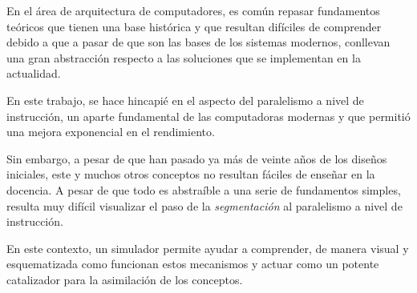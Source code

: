 En el área de arquitectura de computadores, es común repasar fundamentos teóricos
que tienen una base histórica y que resultan difíciles de comprender debido 
a que a pasar de que son las bases de los sistemas modernos, conllevan 
una gran abstracción respecto a las soluciones que se implementan en la actualidad.

\bigskip
En este trabajo, se hace hincapié en el aspecto del paralelismo a nivel de instrucción, 
un aparte fundamental de las computadoras modernas y que permitió una mejora exponencial
en el rendimiento.

\bigskip
Sin embargo, a pesar de que han pasado ya más de veinte años de los diseños iniciales,
este y muchos otros conceptos no resultan fáciles de enseñar en la docencia. A pesar de que 
todo es abstraíble a una serie de fundamentos simples, resulta muy difícil visualizar el 
paso de la \textit{segmentación} al paralelismo a nivel de instrucción.

\bigskip
En este contexto, un simulador permite ayudar a comprender, de manera visual y esquematizada
como funcionan estos mecanismos y actuar como un potente catalizador para la asimilación de los 
conceptos.